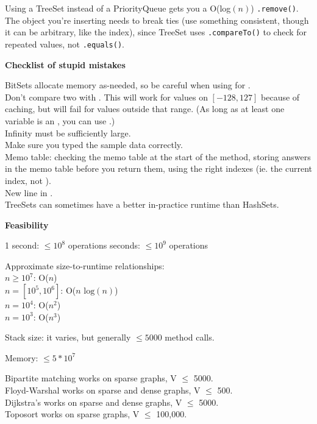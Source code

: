 
Using a TreeSet instead of a PriorityQueue gets you a O(log$(n)$) \lstinline{.remove()}. The object you're inserting needs to break ties (use something consistent, though it can be arbitrary, like the index), since TreeSet uses \lstinline{.compareTo()} to check for repeated values, not \lstinline{.equals()}.

\textbf{Checklist of stupid mistakes}

\indent BitSets allocate memory as-needed, so be careful when using  for . \\
\indent Don't compare two  with \inline{==}. This will work for values on $[-128, 127]$ because of caching, but will fail for values outside that range. (As long as at least one variable is an , you can use \inline{==}.) \\
\indent Infinity must be sufficiently large. \\
\indent Make sure you typed the sample data correctly. \\
\indent Memo table: checking the memo table at the start of the method, storing answers in the memo table before you return them, using the right indexes (ie. the current index, not ). \\
\indent New line in . \\ 
\indent TreeSets can sometimes have a better in-practice runtime than HashSets. 

\textbf{Feasibility}

1 second: $\leq 10^8$ operations \indent{} seconds: $\leq 10^9$ operations

Approximate size-to-runtime relationships: \\
\indent $n \geq 10^7$: O($n$) \\
\indent $n = [10^5, 10^6]$: O($n\text{ log}(n)$) \\
\indent $n = 10^4$: O($n^2$) \\
\indent $n = 10^3$: O($n^3$)

Stack size: it varies, but generally $\leq 5000$ method calls.

Memory: $\leq 5*10^7$

Bipartite matching works on sparse graphs, V $\leq$ 5000. \\
Floyd-Warshal works on sparse and dense graphs, V $\leq$ 500. \\
Dijkstra’s works on sparse and dense graphs, V $\leq$ 5000. \\
Toposort works on sparse graphs, V $\leq$ 100,000.

